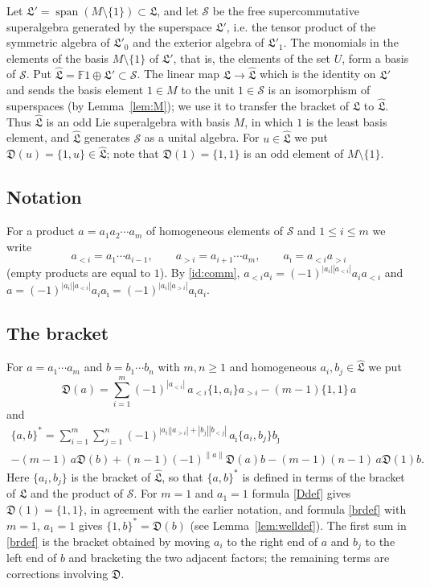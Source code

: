 \documentclass[11pt,reqno]{amsart}
\newcommand{\F}{\mathbb F}
\newcommand{\LL}{\mathfrak L}
\newcommand{\D}{\mathfrak D}
\newcommand{\Sm}{\mathcal S}
\newcommand{\Lh}{\widehat{\LL}}
\newcommand{\rp}[1]{\|#1\|}
\DeclareMathOperator{\spn}{span}
\theoremstyle{plain}
\theoremstyle{definition}
\theoremstyle{remark}
\begin{document}
Let $\LL'=\spn(M\setminus\{1\})\subset\LL$, and let $\Sm$ be the free supercommutative superalgebra generated by the superspace $\LL'$, i.e. the tensor product of the symmetric algebra of $\LL'_0$ and the exterior algebra of $\LL'_1$.
The monomials in the elements of the basis $M\setminus\{1\}$ of $\LL'$, that is, the elements of the set $U$, form a basis of $\Sm$.
Put $\Lh=\F1\oplus\LL'\subset\Sm$.
The linear map $\LL\to\Lh$ which is the identity on $\LL'$ and sends the basis element $1\in M$ to the unit $1\in\Sm$ is an isomorphism of superspaces (by Lemma~\ref{lem:M}); we use it to transfer the bracket of $\LL$ to $\Lh$.
Thus $\Lh$ is an odd Lie superalgebra with basis $M$, in which $1$ is the least basis element, and $\Lh$ generates $\Sm$ as a unital algebra.
For $u\in\Lh$ we put $\D(u)=\{1,u\}\in\Lh$; note that $\D(1)=\{1,1\}$ is an odd element of $M\setminus\{1\}$.

\subsection*{Notation}
For a product $a=a_1a_2\cdots a_m$ of homogeneous elements of $\Sm$ and $1\le i\le m$ we write
$$
a_{<i}=a_1\cdots a_{i-1},\qquad a_{>i}=a_{i+1}\cdots a_m,\qquad a_{\hat\imath}=a_{<i}a_{>i}
$$
(empty products are equal to $1$).
By \eqref{id:comm}, $a_{<i}a_i=(-1)^{|a_i||a_{<i}|}a_ia_{<i}$ and $a=(-1)^{|a_i||a_{<i}|}a_ia_{\hat\imath}=(-1)^{|a_i||a_{>i}|}a_{\hat\imath}a_i$.

\subsection*{The bracket}
For $a=a_1\cdots a_m$ and $b=b_1\cdots b_n$ with $m,n\ge1$ and homogeneous $a_i,b_j\in\Lh$ we put
\begin{equation}\label{Ddef}
\D(a)=\sum_{i=1}^m(-1)^{|a_{<i}|}\,a_{<i}\{1,a_i\}a_{>i}-(m-1)\{1,1\}\,a
\end{equation}
and
\begin{multline}\label{brdef}
\{a,b\}^*=\sum_{i=1}^m\sum_{j=1}^n(-1)^{|a_i||a_{>i}|+|b_j||b_{<j}|}\,a_{\hat\imath}\{a_i,b_j\}b_{\hat\jmath}\\
-(m-1)\,a\D(b)+(n-1)(-1)^{\rp a}\D(a)b-(m-1)(n-1)\,a\D(1)b .
\end{multline}
Here $\{a_i,b_j\}$ is the bracket of $\Lh$, so that $\{a,b\}^*$ is defined in terms of the bracket of $\LL$ and the product of $\Sm$.
For $m=1$ and $a_1=1$ formula \eqref{Ddef} gives $\D(1)=\{1,1\}$, in agreement with the earlier notation, and formula \eqref{brdef} with $m=1$, $a_1=1$ gives $\{1,b\}^*=\D(b)$ (see Lemma~\ref{lem:welldef}).
The first sum in \eqref{brdef} is the bracket obtained by moving $a_i$ to the right end of $a$ and $b_j$ to the left end of $b$ and bracketing the two adjacent factors; the remaining terms are corrections involving $\D$.
\end{document}
